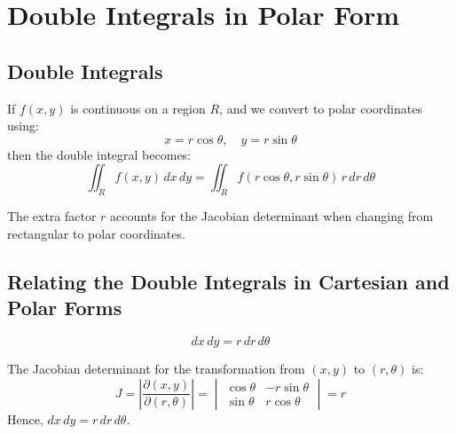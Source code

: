 \chapter{Double Integrals in Polar Form}
\label{chap:double-integrals-in-polar-form}

\section{Double Integrals}
\label{sec:double-integrals-polar-form}

\begin{definition}
  \label{def:polar-double-integral}
  If \(f(x,y)\) is continuous on a region \(R\), and we convert to polar coordinates using:
  \[
    x = r\cos\theta, \quad y = r\sin\theta
  \]
  then the double integral becomes:
  \begin{equation}\label{eq:polar-double-integral}
    \iint_R f(x,y)\,dx\,dy = \iint_R f(r\cos\theta, r\sin\theta)\,r\,dr\,d\theta
  \end{equation}
\end{definition}

\begin{remark}
  The extra factor \(r\) accounts for the Jacobian determinant when changing from rectangular to polar coordinates.
\end{remark}

\section{Relating the Double Integrals in Cartesian and Polar Forms}
\label{sec:relating-the-double-integrals-in-cartesian-and-polar-forms}

\begin{equation}\label{eq:jacobian-cartesian-polar}
  dx\,dy = r\,dr\,d\theta
\end{equation}

\begin{explanation}
  The Jacobian determinant for the transformation from \((x,y)\) to \((r,\theta)\) is:
  \[
    J = \left| \frac{\partial(x,y)}{\partial(r,\theta)} \right| = 
    \begin{vmatrix}
      \cos\theta & -r\sin\theta \\
      \sin\theta & r\cos\theta
    \end{vmatrix}
    = r
  \]
  Hence, \(dx\,dy = r\,dr\,d\theta\).
\end{explanation}

